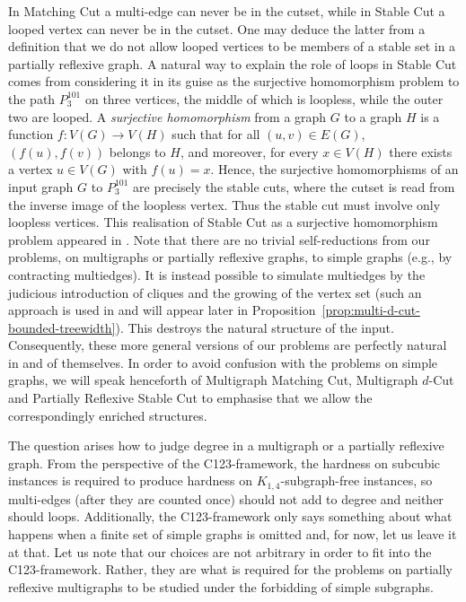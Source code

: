 \documentclass[a4paper,UKenglish,cleveref, autoref,thm-restate]{lipics-v2021}
\begin{document}
In {\sc Matching Cut} a multi-edge can never be in the cutset, while in {\sc Stable Cut} a looped vertex can never be in the cutset. One may deduce the latter from a definition  that we do not allow looped vertices to be members of a stable set in a partially reflexive graph. A natural way to explain the role of loops in {\sc Stable Cut} comes from considering it in its guise as the surjective homomorphism problem to the path $P_3^{101}$ on three vertices, the middle of which is loopless, while the outer two are looped. A {\it surjective homomorphism} from a graph $G$ to a graph $H$ is a function $f:V(G)\to V(H)$ such that for all $(u,v)\in E(G)$, $(f(u),f(v))$ belongs to $H$, and moreover, for every $x\in V(H)$ there exists a vertex $u\in V(G)$ with $f(u)=x$.  Hence, the surjective homomorphisms of an input graph $G$ to $P_3^{101}$ are precisely the stable cuts, where the cutset is read from the inverse image of the loopless vertex. Thus the stable cut must involve only loopless vertices. This realisation of {\sc Stable Cut} as a surjective homomorphism problem 
appeared in \cite{GolovachPaulusmaSong}. 
%
Note that there are no trivial self-reductions from our problems, on multigraphs or partially reflexive graphs, to simple graphs (e.g., by contracting multiedges). It is instead possible to simulate multiedges by the judicious introduction of cliques and the growing of the vertex set (such an approach is used in \cite{GolovachPaulusmaSong} and will appear later in Proposition~\ref{prop:multi-d-cut-bounded-treewidth}). This destroys the natural structure of the input. Consequently, these more general versions of our problems are perfectly natural in and of themselves.
%
In order to avoid confusion with the problems on simple graphs, we will speak henceforth of {\sc Multigraph Matching Cut}, {\sc Multigraph $d$-Cut} and {\sc Partially Reflexive Stable Cut} to emphasise that we allow the correspondingly enriched structures.
 
The question arises how to judge degree in a multigraph or a partially reflexive graph. From the perspective of the C123-framework, the hardness on subcubic instances is required to produce hardness on $K_{1,4}$-subgraph-free instances, so multi-edges (after they are counted once) should not add to degree and neither should loops. Additionally, the C123-framework only says something about what happens when a finite set of simple graphs is omitted and, for now, let us leave it at that. Let us note that our choices are not arbitrary in order to fit into the C123-framework. Rather, they are what is required for the problems on partially reflexive multigraphs to be studied under the forbidding of simple subgraphs.
\end{document}

